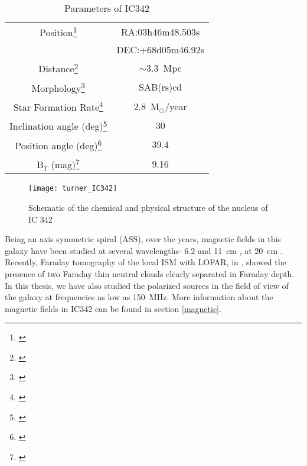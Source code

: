 \documentclass[../main/thesis_msc.tex]{subfiles}
\begin{document}
\begin{table}[t]
        \centering
        \begin{tabular}{cc}
            \hline\hline
            Position\footnote{\citep{ic342_position}} & RA:03h46m48.503s\\ 
                     & DEC:+68d05m46.92s\\
            Distance\footnote{\citep{distance_ic342}} & $\sim$3.3~Mpc\\
            Morphology\footnote{\citep{morphology}} & SAB(rs)cd\\
            Star Formation Rate\footnote{\citep{SFR}} & 2.8~M$_\odot$/year\\
            Inclination angle (deg)\footnote{\citep{H1}} & 30 \\
            Position angle (deg)\footnote{\citep{H1}} & 39.4 \\
            B$_T$ (mag)\footnote{\citep{nobody_cares}} & 9.16 \\
             \bottomrule
        \end{tabular}
        \caption{Parameters of IC342}
        \label{ic342_intro}
    \end{table}
\begin{figure}[h]
\centering
\texttt{[image: turner\_IC342]}
\caption{Schematic of the chemical and physical structure of the nucleus of IC 342\citep{ic342_4}}
\label{swr}
\end{figure}

Being an axis symmetric spiral (ASS), over the years, magnetic fields in this galaxy have been studied at several wavelengths- 6.2 and 11~cm \citep{grave}, at 20~cm \citep{ic342_20}. Recently, Faraday tomography of the local ISM with LOFAR, in \citep{ic342_5}, showed the presence of two Faraday thin neutral clouds clearly separated in Faraday depth.  In this thesis, we have also studied the polarized sources in the field of view of the galaxy at frequencies as low as 150~MHz. More information about the magnetic fields in IC342 can be found in section \ref{magnetic}.
\end{document}
